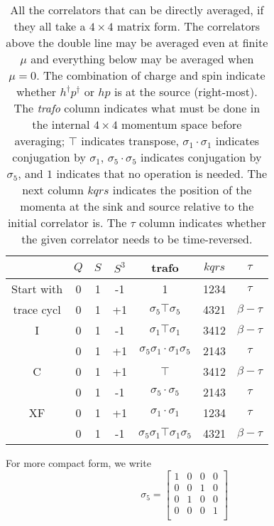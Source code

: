 \begin{table}[h]
  \centering
  \begin{tabular}{c|cccccc}
             & $Q$ & $S$ & $S^3$ & trafo & $kqrs$    & $\tau$  \\
  \hline
  Start with & 0 & 1 & -1 & 1 & 1234 &  $\tau$  \\
  \hline
  trace cycl & 0 & 1 & +1 & $\sigma_5 \top \sigma_5$ & 4321 & $\beta-\tau$ \\
  \hline
  I          & 0 & 1 & -1 & $\sigma_1 \top \sigma_1$ & 3412 & $\beta-\tau$ \\
             & 0 & 1 & +1 & $\sigma_5\sigma_1\cdot\sigma_1\sigma_5$ & 2143 & $\tau$ \\
  \hline\hline
  C          & 0 & 1 & +1 & $\top$ & 3412 & $\beta-\tau$ \\
             & 0 & 1 & -1 & $\sigma_5\cdot\sigma_5$ & 2143 & $\tau$ \\
  \hline
  XF         & 0 & 1 & +1 & $\sigma_1\cdot\sigma_1$ & 1234 & $\tau$ \\
             & 0 & 1 & -1 & $\sigma_5\sigma_1\top\sigma_1\sigma_5$ & 4321 & $\beta-\tau$
  \end{tabular}
  \caption{All the correlators that can be directly averaged, if they all take a $4 \times 4$ matrix form. The correlators above the double line may be averaged even at finite $\mu$ and everything below may be averaged when $\mu = 0$. The combination of charge and spin indicate whether $h^\dagger p^\dagger$ or $hp$ is at the source (right-most). The \textit{trafo} column indicates what must be done in the internal $4 \times 4$ momentum space before averaging; $\top$ indicates transpose, $\sigma_1\cdot\sigma_1$ indicates conjugation by $\sigma_1$, $\sigma_5\cdot\sigma_5$ indicates conjugation by $\sigma_5$, and $1$ indicates that no operation is needed. The next column $kqrs$ indicates the position of the momenta at the sink and source relative to the initial correlator is. The $\tau$ column indicates whether the given correlator needs to be time-reversed.}
  \label{tab:phhp}
\end{table}

For more compact form, we write
\\
\begin{equation}
 \sigma_5 = \left[ {\begin{array}{cccc}
    1 & 0 & 0 & 0 \\
    0 & 0 & 1 & 0 \\
    0 & 1 & 0 & 0 \\
    0 & 0 & 0 & 1 \\
  \end{array} } \right]
\end{equation}


